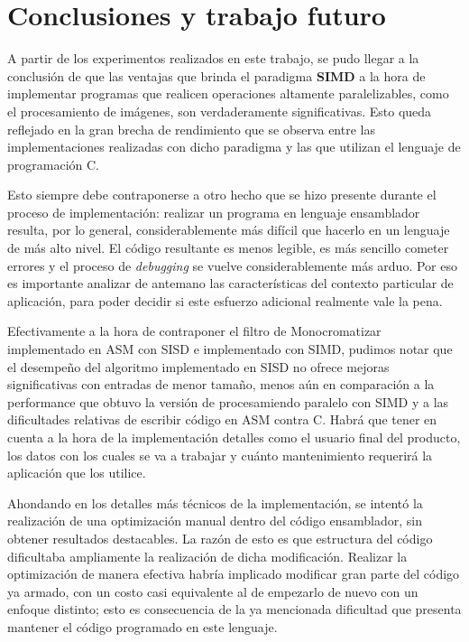 \section{Conclusiones y trabajo futuro}

    A partir de los experimentos realizados en este trabajo, se pudo llegar a la conclusión de que las ventajas que brinda el paradigma \textbf{SIMD} a la hora de implementar programas que realicen operaciones altamente paralelizables, como el procesamiento de imágenes, son verdaderamente significativas. Esto queda reflejado en la gran brecha de rendimiento que se observa entre las implementaciones realizadas con dicho paradigma y las que utilizan el lenguaje de programación C.

    Esto siempre debe contraponerse a otro hecho que se hizo presente durante el proceso de implementación: realizar un programa en lenguaje ensamblador resulta, por lo general, considerablemente más difícil que hacerlo en un lenguaje de más alto nivel. El código resultante es menos legible, es más sencillo cometer errores y el proceso de \emph{debugging} se vuelve considerablemente más arduo. Por eso es importante analizar de antemano las características del contexto particular de aplicación, para poder decidir si este esfuerzo adicional realmente vale la pena.

    Efectivamente a la hora de contraponer el filtro de Monocromatizar implementado en ASM con SISD e implementado con SIMD, pudimos notar que el desempeño del algoritmo implementado en SISD no ofrece mejoras significativas con entradas de menor tamaño, menos aún en comparación a la performance que obtuvo la versión de procesamiendo paralelo con SIMD y a las dificultades relativas de escribir código en ASM contra C. Habrá que tener en cuenta a la hora de la implementación detalles como el usuario final del producto, los datos con los cuales se va a trabajar y cuánto mantenimiento requerirá la aplicación que los utilice.

    Ahondando en los detalles más técnicos de la implementación, se intentó la realización de una optimización manual dentro del código ensamblador, sin obtener resultados destacables. La razón de esto es que estructura del código dificultaba ampliamente la realización de dicha modificación. Realizar la optimización de manera efectiva habría implicado modificar gran parte del código ya armado, con un costo casi equivalente al de empezarlo de nuevo con un enfoque distinto; esto es consecuencia de la ya mencionada dificultad que presenta mantener el código programado en este lenguaje.

